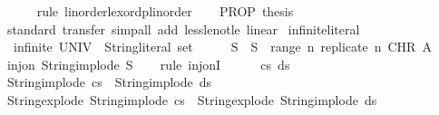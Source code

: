 \begin{isabellebody}
\ \ \ \ \isamarkupfalse%
\ {\isacharparenleft}{\kern0pt}rule\ linorder{\isachardot}{\kern0pt}lexordp{\isacharunderscore}{\kern0pt}linorder{\isacharparenright}{\kern0pt}\isanewline
\ \ \isamarkupfalse%
\ {\isachardoublequoteopen}PROP\ {\isacharquery}{\kern0pt}thesis{\isachardoublequoteclose}\isanewline
\ \ \ \ \isamarkupfalse%
\ {\isacharparenleft}{\kern0pt}standard{\isacharsemicolon}{\kern0pt}\ transfer{\isacharparenright}{\kern0pt}\ {\isacharparenleft}{\kern0pt}simp{\isacharunderscore}{\kern0pt}all\ add{\isacharcolon}{\kern0pt}\ less{\isacharunderscore}{\kern0pt}le{\isacharunderscore}{\kern0pt}not{\isacharunderscore}{\kern0pt}le\ linear{\isacharparenright}{\kern0pt}\isanewline
{}\isamarkupfalse%
%
\endisatagproof
{\isafoldproof}%
%
\isadelimproof
%
\endisadelimproof
\isanewline
\isanewline
{}\isamarkupfalse%
\isanewline
\isanewline
{}\isamarkupfalse%
\isanewline
\isanewline
{}\isamarkupfalse%
\ infinite{\isacharunderscore}{\kern0pt}literal{\isacharcolon}{\kern0pt}\isanewline
\ \ {\isachardoublequoteopen}infinite\ {\isacharparenleft}{\kern0pt}UNIV\ {\isacharcolon}{\kern0pt}{\isacharcolon}{\kern0pt}\ String{\isachardot}{\kern0pt}literal\ set{\isacharparenright}{\kern0pt}{\isachardoublequoteclose}\isanewline
%
\isadelimproof
%
\endisadelimproof
%
\isatagproof
{}\isamarkupfalse%
\ {\isacharminus}{\kern0pt}\isanewline
\ \ \isamarkupfalse%
\ S\ \ {\isachardoublequoteopen}S\ {\isacharequal}{\kern0pt}\ range\ {\isacharparenleft}{\kern0pt}{\isasymlambda}n{\isachardot}{\kern0pt}\ replicate\ n\ CHR\ {\isacharprime}{\kern0pt}{\isacharprime}{\kern0pt}A{\isacharprime}{\kern0pt}{\isacharprime}{\kern0pt}{\isacharparenright}{\kern0pt}{\isachardoublequoteclose}\isanewline
\ \ \isamarkupfalse%
\ {\isachardoublequoteopen}inj{\isacharunderscore}{\kern0pt}on\ String{\isachardot}{\kern0pt}implode\ S{\isachardoublequoteclose}\isanewline
\ \ \isamarkupfalse%
\ {\isacharparenleft}{\kern0pt}rule\ inj{\isacharunderscore}{\kern0pt}onI{\isacharparenright}{\kern0pt}\isanewline
\ \ \ \ \isamarkupfalse%
\ cs\ ds\isanewline
\ \ \ \ \isamarkupfalse%
\ {\isachardoublequoteopen}String{\isachardot}{\kern0pt}implode\ cs\ {\isacharequal}{\kern0pt}\ String{\isachardot}{\kern0pt}implode\ ds{\isachardoublequoteclose}\isanewline
\ \ \ \ \isamarkupfalse%
\ \isamarkupfalse%
\ {\isachardoublequoteopen}String{\isachardot}{\kern0pt}explode\ {\isacharparenleft}{\kern0pt}String{\isachardot}{\kern0pt}implode\ cs{\isacharparenright}{\kern0pt}\ {\isacharequal}{\kern0pt}\ String{\isachardot}{\kern0pt}explode\ {\isacharparenleft}{\kern0pt}String{\isachardot}{\kern0pt}implode\ ds{\isacharparenright}{\kern0pt}{\isachardoublequoteclose}\isanewline

\end{isabellebody}
